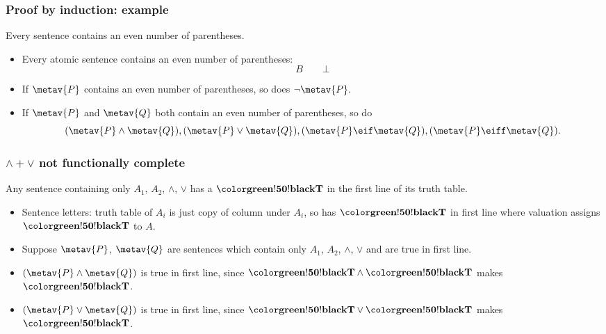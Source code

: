 \begin{frame}
    \frametitle{Proof by induction: example}

\begin{theorem}
Every sentence contains an even number of parentheses.
\end{theorem}

\begin{itemize}[<+->]
\item Every atomic sentence contains an even number of parentheses:
\[
B \qquad \bot
\]
\item If $\metav{P}$ contains an even number of parentheses, so does $\lnot \metav{P}.$
\item If $\metav{P}$ and $\metav{Q}$ both contain an even number of parentheses, so do
\[ (\metav{P} \land \metav{Q}), (\metav{P} \lor \metav{Q}), (\metav{P} \eif \metav{Q}), (\metav{P} \eiff \metav{Q}). \]
\end{itemize}
\end{frame}

\begin{frame}
  \frametitle{$\land + \lor$ not functionally complete}

\begin{theorem}
Any sentence containing only $A_1$, $A_2$, $\land$, $\lor$
has a $\True$ in the first line of its truth table.
\end{theorem}

\begin{itemize}[<+->]
\item Sentence letters: truth table of $A_i$ is just copy of column under $A_i$, so has $\True$ in first line where valuation assigns $\True$ to $A$.  
\item Suppose $\metav{P}$, $\metav{Q}$ are sentences which
  contain only $A_1$, $A_2$, $\land$, $\lor$ and are true in first line.
\item $(\metav{P} \land \metav{Q})$ is true in first line, since $\True \land \True$ makes $\True$.
\item $(\metav{P} \lor \metav{Q})$ is true in first line, since $\True
\lor \True$ makes $\True$.
\end{itemize}
\end{frame}

